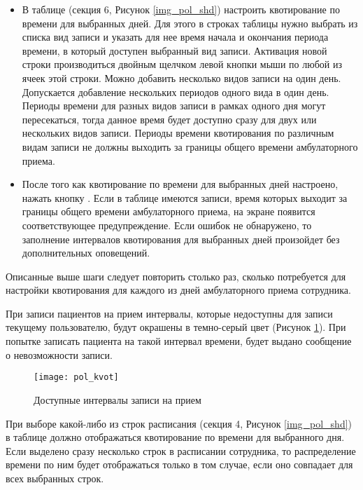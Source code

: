 \begin{itemize}
 \item В таблице  (секция 6, Рисунок \ref{img_pol_shd}) настроить квотирование по времени для выбранных дней. Для этого в строках таблицы нужно выбрать из списка вид записи и указать для нее время начала и окончания периода времени, в который доступен выбранный вид записи. Активация новой строки производиться двойным щелчком левой кнопки мыши по любой из ячеек этой строки. Можно добавить несколько видов записи на один день. Допускается добавление нескольких периодов одного вида в один день. Периоды времени для разных видов записи в рамках одного дня могут пересекаться, тогда данное время будет доступно сразу для двух или нескольких видов записи. Периоды времени квотирования по различным видам записи не должны выходить за границы общего времени амбулаторного приема.
 \item После того как квотирование по времени для выбранных дней настроено, нажать кнопку . Если в таблице  имеются записи, время которых выходит за границы общего времени амбулаторного приема, на экране появится соответствующее предупреждение. Если ошибок не обнаружено, то заполнение интервалов квотирования для выбранных дней произойдет без дополнительных оповещений.
\end{itemize}
 
Описанные выше шаги следует повторить столько раз, сколько потребуется для настройки квотирования для каждого из дней амбулаторного приема сотрудника.

При записи пациентов на прием интервалы, которые недоступны для записи текущему пользователю, будут окрашены в темно-серый цвет (Рисунок \ref{img_pol_kvot}). При попытке записать пациента на такой интервал времени, будет выдано сообщение о невозможности записи.

\begin{figure}[ht]\centering
 \texttt{[image: pol\_kvot]}
 \caption{Доступные интервалы записи на прием}
 \label{img_pol_kvot}
\end{figure}

При выборе какой-либо из строк расписания (секция 4, Рисунок \ref{img_pol_shd}) в таблице  должно отображаться квотирование по времени для выбранного дня. Если выделено сразу несколько строк в расписании сотрудника, то распределение времени по ним будет отображаться только в том случае, если оно совпадает для всех выбранных строк.

